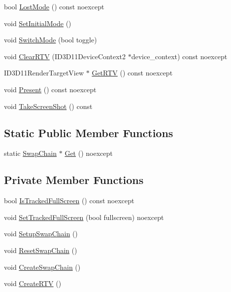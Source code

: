 \begin{DoxyCompactItemize}
\item 
bool \hyperlink{classmage_1_1_swap_chain_aba3697d2b641b99f7e89fcc59613f89d}{Lost\+Mode} () const noexcept
\item 
void \hyperlink{classmage_1_1_swap_chain_a662009705a6e23064351fd0d9b77ef0e}{Set\+Initial\+Mode} ()
\item 
void \hyperlink{classmage_1_1_swap_chain_ada1b8857eeac3d00287fb624645e365e}{Switch\+Mode} (bool toggle)
\item 
void \hyperlink{classmage_1_1_swap_chain_a3e78e19609d97b9e599f49d7e79e24af}{Clear\+R\+TV} (I\+D3\+D11\+Device\+Context2 $\ast$device\+\_\+context) const noexcept
\item 
I\+D3\+D11\+Render\+Target\+View $\ast$ \hyperlink{classmage_1_1_swap_chain_a0b54dff5a39f10d9073bdbb1121a6144}{Get\+R\+TV} () const noexcept
\item 
void \hyperlink{classmage_1_1_swap_chain_a477d34baf72331aeff23f32cd34518b6}{Present} () const noexcept
\item 
void \hyperlink{classmage_1_1_swap_chain_a23a4618b5104203c5a5c962696ae3b53}{Take\+Screen\+Shot} () const
\end{DoxyCompactItemize}
\subsection*{Static Public Member Functions}
\begin{DoxyCompactItemize}
\item 
static \hyperlink{classmage_1_1_swap_chain}{Swap\+Chain} $\ast$ \hyperlink{classmage_1_1_swap_chain_a9ed25cd34dedc97e25e26e58456ac2fe}{Get} () noexcept
\end{DoxyCompactItemize}
\subsection*{Private Member Functions}
\begin{DoxyCompactItemize}
\item 
bool \hyperlink{classmage_1_1_swap_chain_ad3b35e10612f7219cc4b6d61039e2f8c}{Is\+Tracked\+Full\+Screen} () const noexcept
\item 
void \hyperlink{classmage_1_1_swap_chain_ae2689c07632f1fdc8367c9eefd62851b}{Set\+Tracked\+Full\+Screen} (bool fullscreen) noexcept
\item 
void \hyperlink{classmage_1_1_swap_chain_aec2b14bc569046174f6a416a7f20c8d5}{Setup\+Swap\+Chain} ()
\item 
void \hyperlink{classmage_1_1_swap_chain_a30b25245e86823e1b08a39887de8d918}{Reset\+Swap\+Chain} ()
\item 
void \hyperlink{classmage_1_1_swap_chain_a9474cae31868f020c76439febc6e1afd}{Create\+Swap\+Chain} ()
\item 
void \hyperlink{classmage_1_1_swap_chain_a9cdb798d8911e2f1239ad7eb79cc6b87}{Create\+R\+TV} ()
\end{DoxyCompactItemize}
